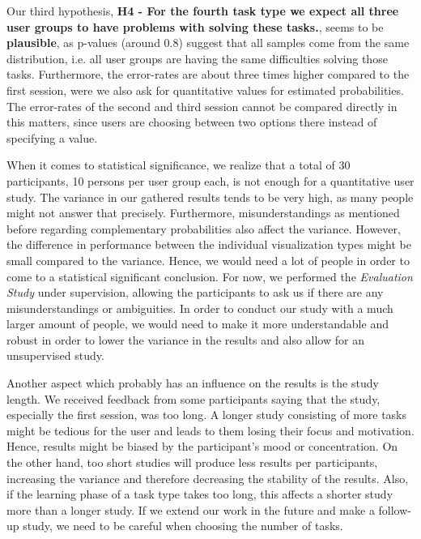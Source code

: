 Our third hypothesis, \textbf{H4 - For the fourth task type we expect all three user groups to have problems with solving these tasks.}, seems to be \textbf{plausible}, as p-values (around 0.8) suggest that all samples come from the same distribution, i.e. all user groups are having the same difficulties solving those tasks. Furthermore, the error-rates are about three times higher compared to the first session, were we also ask for quantitative values for estimated probabilities. The error-rates of the second and third session cannot be compared directly in this matters, since users are choosing between two options there instead of specifying a value. \par \medskip

When it comes to statistical significance, we realize that a total of 30 participants, 10 persons per user group each, is not enough for a quantitative user study. The variance in our gathered results tends to be very high, as many people might not answer that precisely. Furthermore, misunderstandings as mentioned before regarding complementary probabilities also affect the variance. However, the difference in performance between the individual visualization types might be small compared to the variance. Hence, we would need a lot of people in order to come to a statistical significant conclusion. For now, we performed the \textit{Evaluation Study} under supervision, allowing the participants to ask us if there are any misunderstandings or ambiguities. In order to conduct our study with a much larger amount of people, we would need to make it more understandable and robust in order to lower the variance in the results and also allow for an unsupervised study. \par \medskip

Another aspect which probably has an influence on the results is the study length. We received feedback from some participants saying that the study, especially the first session, was too long. A longer study consisting of more tasks might be tedious for the user and leads to them losing their focus and motivation. Hence, results might be biased by the participant’s mood or concentration. On the other hand, too short studies will produce less results per participants, increasing the variance and therefore decreasing the stability of the results. Also, if the learning phase of a task type takes too long, this affects a shorter study more than a longer study. If we extend our work in the future and make a follow-up study, we need to be careful when choosing the number of tasks.